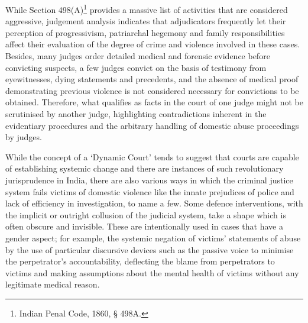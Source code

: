 \begin{multicols}{2}
\noi
While Section 498(A)\footnote{Indian Penal Code, 1860, § 498A.} provides a massive list of activities that are considered aggressive,
judgement analysis indicates that adjudicators frequently let their perception of
progressivism, patriarchal hegemony and family responsibilities affect their evaluation of the
degree of crime and violence involved in these cases. Besides, many judges order detailed
medical and forensic evidence before convicting suspects, a few judges convict on the basis
of testimony from eyewitnesses, dying statements and precedents, and the absence of medical
proof demonstrating previous violence is not considered necessary for convictions to be
obtained. Therefore, what qualifies as facts in the court of one judge might not be scrutinised
by another judge, highlighting contradictions inherent in the evidentiary procedures and the
arbitrary handling of domestic abuse proceedings by judges.

\noi
While the concept of a ‘Dynamic Court’ tends to suggest that courts are capable of
establishing systemic change and there are instances of such revolutionary jurisprudence in
India, there are also various ways in which the criminal justice system fails victims of
domestic violence like the innate prejudices of police and lack of efficiency in investigation,
to name a few. Some defence interventions, with the implicit or outright collusion of the
judicial system, take a shape which is often obscure and invisible. These are intentionally
used in cases that have a gender aspect; for example, the systemic negation of victims’
statements of abuse by the use of particular discursive devices such as the passive voice to
minimise the perpetrator’s accountability, deflecting the blame from perpetrators to victims
and making assumptions about the mental health of victims without any legitimate medical
reason. 

\vspace{-.1cm}


\vspace{-.1cm}


\end{multicols}
